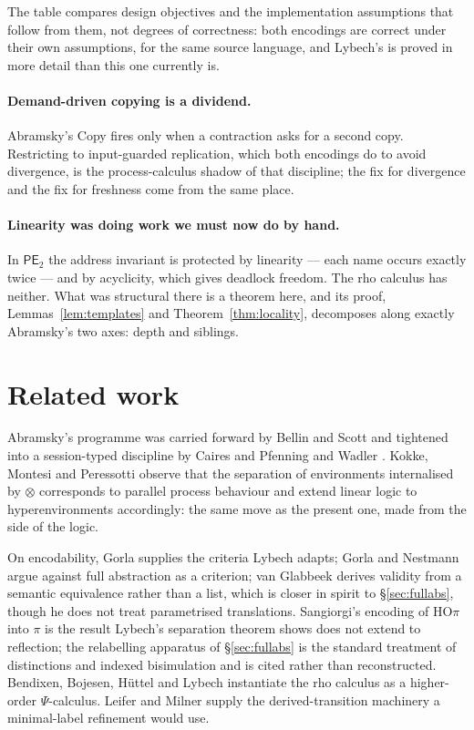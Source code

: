 \documentclass[11pt]{article}
\theoremstyle{definition}
\theoremstyle{plain}
\theoremstyle{remark}
\begin{document}
The table compares design objectives and the implementation assumptions
that follow from them, not degrees of correctness: both encodings are
correct under their own assumptions, for the same source language, and
Lybech's is proved in more detail than this one currently is.

\paragraph{Demand-driven copying is a dividend.}
Abramsky's Copy fires only when a contraction asks for a second copy.
Restricting to input-guarded replication, which both encodings do to
avoid divergence, is the process-calculus shadow of that discipline; the
fix for divergence and the fix for freshness come from the same place.

\paragraph{Linearity was doing work we must now do by hand.}
In $\mathsf{PE}_2$ the address invariant is protected by linearity --- each
name occurs exactly twice --- and by acyclicity, which gives deadlock
freedom. The rho calculus has neither. What was structural there is a
theorem here, and its proof, Lemmas~\ref{lem:templates} and
Theorem~\ref{thm:locality}, decomposes along exactly Abramsky's two axes:
depth and siblings.

\section{Related work}\label{sec:related}

Abramsky's programme was carried forward by Bellin and Scott
\cite{BellinScott94} and tightened into a session-typed discipline by
Caires and Pfenning \cite{CairesPfenning10} and Wadler \cite{Wadler14}.
Kokke, Montesi and Peressotti \cite{HCP} observe that the separation of
environments internalised by $\otimes$ corresponds to parallel process
behaviour and extend linear logic to hyperenvironments accordingly: the
same move as the present one, made from the side of the logic.

On encodability, Gorla \cite{Gorla10} supplies the criteria Lybech
adapts; Gorla and Nestmann \cite{GorlaNestmann14} argue against full
abstraction as a criterion; van Glabbeek \cite{Glabbeek18} derives
validity from a semantic equivalence rather than a list, which is closer
in spirit to \S\ref{sec:fullabs}, though he does not treat parametrised
translations. Sangiorgi's encoding of HO$\pi$ into $\pi$
\cite{Sangiorgi93} is the result Lybech's separation theorem shows does
not extend to reflection; the relabelling apparatus of
\S\ref{sec:fullabs} is the standard treatment of distinctions and indexed
bisimulation \cite{SangiorgiWalker01} and is cited rather than
reconstructed. Bendixen, Bojesen, H\"uttel and Lybech \cite{Psi}
instantiate the rho calculus as a higher-order $\Psi$-calculus. Leifer
and Milner \cite{LeiferMilner00} supply the derived-transition machinery
a minimal-label refinement would use.
\end{document}
